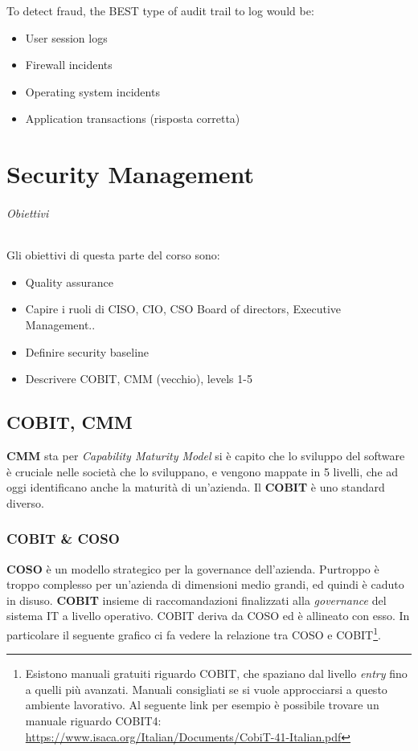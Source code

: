 

To detect fraud, the BEST type of audit trail to log would be:
\begin{itemize}
\item User session logs
\item Firewall incidents
\item Operating system incidents
\item Application transactions (risposta corretta)
\end{itemize}

\part{Security Management}

\paragraph{Obiettivi}

Gli obiettivi di questa parte del corso sono:
\begin{itemize}
\item Quality assurance
\item Capire i ruoli di CISO, CIO, CSO Board of directors, Executive 
Management..
\item Definire security baseline 
\item Descrivere COBIT, CMM (vecchio), levels 1-5
\end{itemize}

\chapter{COBIT, CMM}

\textbf{CMM} sta per \textit{Capability Maturity Model} si è capito che lo 
sviluppo del software è cruciale nelle società che lo sviluppano, e vengono 
mappate in 5 livelli, che ad oggi identificano anche la maturità di un'azienda. 
Il \textbf{COBIT} è uno standard diverso.

\section{COBIT \& COSO}

\textbf{COSO} è un modello strategico per la governance dell'azienda. Purtroppo 
è troppo complesso per un'azienda di dimensioni medio grandi, ed quindi è caduto 
in disuso.
\textbf{COBIT} insieme di raccomandazioni finalizzati alla \textit{governance} 
del sistema IT a livello operativo.
COBIT deriva da COSO ed è allineato con esso. In particolare il seguente grafico 
ci fa vedere la relazione tra COSO e COBIT\footnote{Esistono manuali gratuiti 
riguardo COBIT, che spaziano dal livello \textit{entry} fino a quelli più 
avanzati. Manuali consigliati se si vuole approcciarsi a questo ambiente 
lavorativo. Al seguente link per esempio è possibile trovare un manuale riguardo 
COBIT4:  \url{https://www.isaca.org/Italian/Documents/CobiT-41-Italian.pdf}}.

